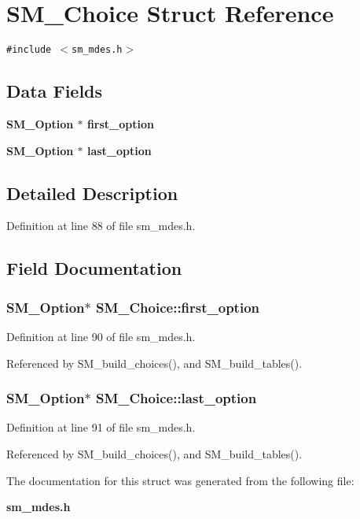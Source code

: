 \section{SM\_\-Choice Struct Reference}
\label{structSM__Choice}
{\tt \#include $<$sm\_\-mdes.h$>$}

\subsection*{Data Fields}
\begin{CompactItemize}
\item 
\bf{SM\_\-Option} $\ast$ \bf{first\_\-option}
\item 
\bf{SM\_\-Option} $\ast$ \bf{last\_\-option}
\end{CompactItemize}


\subsection{Detailed Description}




Definition at line 88 of file sm\_\-mdes.h.

\subsection{Field Documentation}
\subsubsection{\setlength{\rightskip}{0pt plus 5cm}\bf{SM\_\-Option}$\ast$ \bf{SM\_\-Choice::first\_\-option}}\label{structSM__Choice_b6174dcd65fd2ea558905ea3739857c1}




Definition at line 90 of file sm\_\-mdes.h.

Referenced by SM\_\-build\_\-choices(), and SM\_\-build\_\-tables().
\subsubsection{\setlength{\rightskip}{0pt plus 5cm}\bf{SM\_\-Option}$\ast$ \bf{SM\_\-Choice::last\_\-option}}\label{structSM__Choice_2d2a2f01c886e4f2bcc3907750fba403}




Definition at line 91 of file sm\_\-mdes.h.

Referenced by SM\_\-build\_\-choices(), and SM\_\-build\_\-tables().

The documentation for this struct was generated from the following file:\begin{CompactItemize}
\item 
\bf{sm\_\-mdes.h}\end{CompactItemize}
